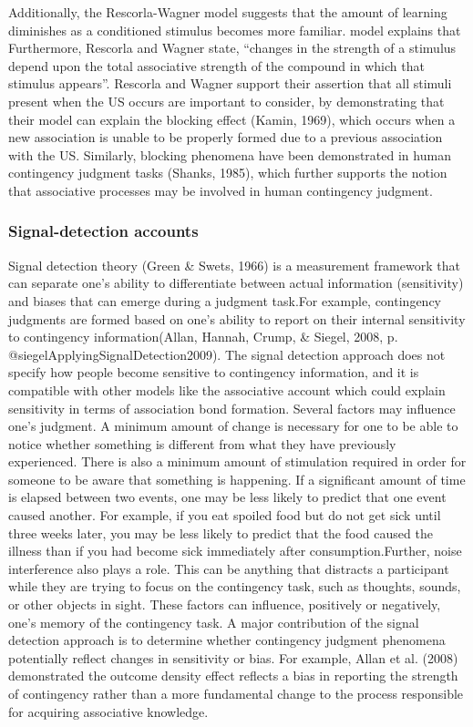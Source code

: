 \documentclass[
  english,
  man,floatsintext]{apa6}
\begin{document}
Additionally, the Rescorla-Wagner model suggests that the amount of learning diminishes as a conditioned stimulus becomes more familiar. model explains that Furthermore, Rescorla and Wagner state, \enquote{changes in the strength of a stimulus depend upon the total associative strength of the compound in which that stimulus appears}. Rescorla and Wagner support their assertion that all stimuli present when the US occurs are important to consider, by demonstrating that their model can explain the blocking effect (Kamin, 1969), which occurs when a new association is unable to be properly formed due to a previous association with the US. Similarly, blocking phenomena have been demonstrated in human contingency judgment tasks (Shanks, 1985), which further supports the notion that associative processes may be involved in human contingency judgment.

\hypertarget{signal-detection-accounts}{%
\subsubsection{Signal-detection accounts}\label{signal-detection-accounts}}

Signal detection theory (Green \& Swets, 1966) is a measurement framework that can separate one's ability to differentiate between actual information (sensitivity) and biases that can emerge during a judgment task.For example, contingency judgments are formed based on one's ability to report on their internal sensitivity to contingency information(Allan, Hannah, Crump, \& Siegel, 2008, p. @siegelApplyingSignalDetection2009). The signal detection approach does not specify how people become sensitive to contingency information, and it is compatible with other models like the associative account which could explain sensitivity in terms of association bond formation. Several factors may influence one's judgment. A minimum amount of change is necessary for one to be able to notice whether something is different from what they have previously experienced. There is also a minimum amount of stimulation required in order for someone to be aware that something is happening. If a significant amount of time is elapsed between two events, one may be less likely to predict that one event caused another. For example, if you eat spoiled food but do not get sick until three weeks later, you may be less likely to predict that the food caused the illness than if you had become sick immediately after consumption.Further, noise interference also plays a role. This can be anything that distracts a participant while they are trying to focus on the contingency task, such as thoughts, sounds, or other objects in sight. These factors can influence, positively or negatively, one's memory of the contingency task. A major contribution of the signal detection approach is to determine whether contingency judgment phenomena potentially reflect changes in sensitivity or bias. For example, Allan et al. (2008) demonstrated the outcome density effect reflects a bias in reporting the strength of contingency rather than a more fundamental change to the process responsible for acquiring associative knowledge.
\end{document}
